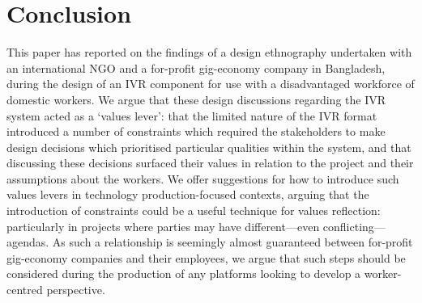 \section{Conclusion}

This paper has reported on the findings of a design ethnography undertaken with an international NGO and a for-profit gig-economy company in Bangladesh, during the design of an IVR component for use with a disadvantaged workforce of domestic workers. We argue that these design discussions regarding the IVR system acted as a `values lever': that the limited nature of the IVR format introduced a number of constraints which required the stakeholders to make design decisions which prioritised particular qualities within the system, and that discussing these decisions surfaced their values in relation to the project and their assumptions about the workers. We offer suggestions for how to introduce such values levers in technology production-focused contexts, arguing that the introduction of constraints could be a useful technique for values reflection: particularly in projects where parties may have different---even conflicting---agendas. As such a relationship is seemingly almost guaranteed between for-profit gig-economy companies and their employees, we argue that such steps should be considered during the production of any platforms looking to develop a worker-centred perspective.